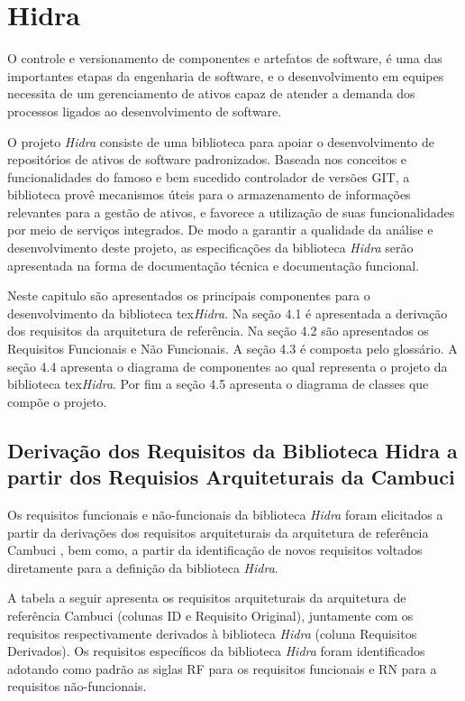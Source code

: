 \chapter{Hidra} \label{chapter:hidra}

O controle e versionamento de componentes e artefatos de software, é uma das importantes etapas da engenharia de software, e o desenvolvimento em equipes necessita de um gerenciamento de ativos capaz de atender a demanda dos processos ligados ao desenvolvimento de software.

O projeto \textit{Hidra} consiste de uma biblioteca para apoiar o desenvolvimento de repositórios de ativos de software padronizados. Baseada nos conceitos e funcionalidades do famoso e bem sucedido controlador de versões GIT, a biblioteca provê mecanismos úteis para o armazenamento de informações relevantes para a gestão de ativos, e favorece a utilização de suas funcionalidades por meio de serviços integrados. De modo a garantir a qualidade da análise e desenvolvimento deste projeto, as especificações da biblioteca \textit{Hidra} serão apresentada na forma de documentação técnica e documentação funcional.

Neste capitulo são apresentados os principais componentes para o desenvolvimento da biblioteca tex\textit{Hidra}. Na seção 4.1 é apresentada a derivação dos requisitos da arquitetura de referência. Na seção 4.2 são apresentados os Requisitos Funcionais e Não Funcionais. A seção 4.3 é composta pelo glossário. A seção 4.4 apresenta o diagrama de componentes ao qual representa o projeto da biblioteca tex\textit{Hidra}. Por fim a seção 4.5 apresenta o diagrama de classes que compõe o projeto.

\section{Derivação dos Requisitos da Biblioteca Hidra a partir dos Requisios Arquiteturais da Cambuci}


Os requisitos funcionais e não-funcionais da biblioteca \textit{Hidra} foram elicitados a partir da derivações dos requisitos arquiteturais da arquitetura de referência Cambuci \cite{dissertacaoOsshiro2014}, bem como, a partir da identificação de novos requisitos voltados diretamente para a definição da biblioteca \textit{Hidra}.

A tabela a seguir apresenta os requisitos arquiteturais da arquitetura de referência Cambuci (colunas ID e Requisito Original), juntamente com os requisitos respectivamente derivados à biblioteca \textit{Hidra} (coluna Requisitos Derivados). Os requisitos específicos da biblioteca \textit{Hidra} foram identificados adotando como padrão as siglas RF para os requisitos funcionais e RN para a requisitos não-funcionais.

\newpage









